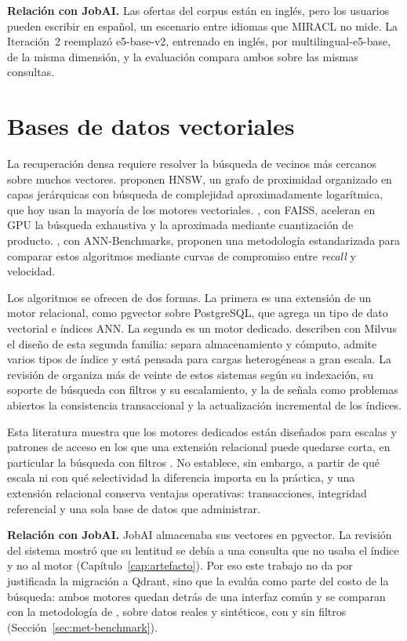 \textbf{Relación con JobAI.} Las ofertas del corpus están en inglés, pero los usuarios pueden escribir en español, un escenario entre idiomas que MIRACL no mide. La Iteración~2 reemplazó e5-base-v2, entrenado en inglés, por multilingual-e5-base, de la misma dimensión, y la evaluación compara ambos sobre las mismas consultas.

\section{Bases de datos vectoriales}
\label{sec:estado-arte-vectordb}

La recuperación densa requiere resolver la búsqueda de vecinos más cercanos sobre muchos vectores. \citet{Malkov2020} proponen HNSW, un grafo de proximidad organizado en capas jerárquicas con búsqueda de complejidad aproximadamente logarítmica, que hoy usan la mayoría de los motores vectoriales. \citet{Johnson2019}, con FAISS, aceleran en GPU la búsqueda exhaustiva y la aproximada mediante cuantización de producto. \citet{Aumuller2020}, con ANN-Benchmarks, proponen una metodología estandarizada para comparar estos algoritmos mediante curvas de compromiso entre \textit{recall} y velocidad.

Los algoritmos se ofrecen de dos formas. La primera es una extensión de un motor relacional, como pgvector sobre PostgreSQL, que agrega un tipo de dato vectorial e índices ANN. La segunda es un motor dedicado. \citet{Wang2021} describen con Milvus el diseño de esta segunda familia: separa almacenamiento y cómputo, admite varios tipos de índice y está pensada para cargas heterogéneas a gran escala. La revisión de \citet{Pan2024} organiza más de veinte de estos sistemas según su indexación, su soporte de búsqueda con filtros y su escalamiento, y la de \citet{Taipalus2024} señala como problemas abiertos la consistencia transaccional y la actualización incremental de los índices.

Esta literatura muestra que los motores dedicados están diseñados para escalas y patrones de acceso en los que una extensión relacional puede quedarse corta, en particular la búsqueda con filtros \citep{Sanca2024}. No establece, sin embargo, a partir de qué escala ni con qué selectividad la diferencia importa en la práctica, y una extensión relacional conserva ventajas operativas: transacciones, integridad referencial y una sola base de datos que administrar.

\textbf{Relación con JobAI.} JobAI almacenaba sus vectores en pgvector. La revisión del sistema mostró que su lentitud se debía a una consulta que no usaba el índice y no al motor (Capítulo~\ref{cap:artefacto}). Por eso este trabajo no da por justificada la migración a Qdrant, sino que la evalúa como parte del costo de la búsqueda: ambos motores quedan detrás de una interfaz común y se comparan con la metodología de \citet{Aumuller2020}, sobre datos reales y sintéticos, con y sin filtros (Sección~\ref{sec:met-benchmark}).


